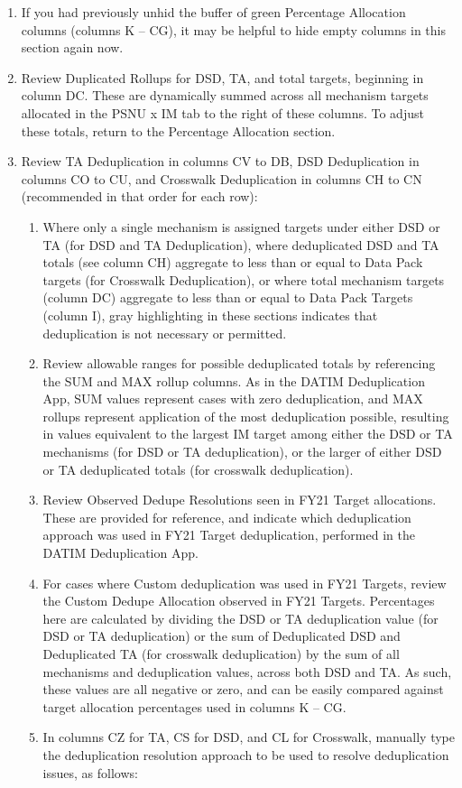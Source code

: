 \documentclass[
  openany]{book}
\begin{document}
\begin{enumerate}
\def\labelenumi{\arabic{enumi}.}
\item
  If you had previously unhid the buffer of green Percentage
  Allocation columns (columns K -- CG), it may be helpful to hide
  empty columns in this section again now.
\item
  Review Duplicated Rollups for DSD, TA, and total targets, beginning
  in column DC. These are dynamically summed across all mechanism
  targets allocated in the PSNU x IM tab to the right of these
  columns. To adjust these totals, return to the Percentage Allocation
  section.
\item
  Review TA Deduplication in columns CV to DB, DSD Deduplication in
  columns CO to CU, and Crosswalk Deduplication in columns CH to CN
  (recommended in that order for each row):

  \begin{enumerate}
  \def\labelenumii{\alph{enumii}.}
  \item
    Where only a single mechanism is assigned targets under either
    DSD or TA (for DSD and TA Deduplication), where deduplicated DSD
    and TA totals (see column CH) aggregate to less than or equal to
    Data Pack targets (for Crosswalk Deduplication), or where total
    mechanism targets (column DC) aggregate to less than or equal to
    Data Pack Targets (column I), gray highlighting in these
    sections indicates that deduplication is not necessary or
    permitted.
  \item
    Review allowable ranges for possible deduplicated totals by
    referencing the SUM and MAX rollup columns. As in the DATIM
    Deduplication App, SUM values represent cases with zero
    deduplication, and MAX rollups represent application of the most
    deduplication possible, resulting in values equivalent to the
    largest IM target among either the DSD or TA mechanisms (for DSD
    or TA deduplication), or the larger of either DSD or TA
    deduplicated totals (for crosswalk deduplication).
  \item
    Review Observed Dedupe Resolutions seen in FY21 Target
    allocations. These are provided for reference, and indicate
    which deduplication approach was used in FY21 Target
    deduplication, performed in the DATIM Deduplication App.
  \item
    For cases where Custom deduplication was used in FY21 Targets,
    review the Custom Dedupe Allocation observed in FY21 Targets.
    Percentages here are calculated by dividing the DSD or TA
    deduplication value (for DSD or TA deduplication) or the sum of
    Deduplicated DSD and Deduplicated TA (for crosswalk
    deduplication) by the sum of all mechanisms and deduplication
    values, across both DSD and TA. As such, these values are all
    negative or zero, and can be easily compared against target
    allocation percentages used in columns K -- CG.
  \item
    In columns CZ for TA, CS for DSD, and CL for Crosswalk, manually
    type the deduplication resolution approach to be used to resolve
    deduplication issues, as follows:


\end{enumerate}
\end{enumerate}
\end{document}
